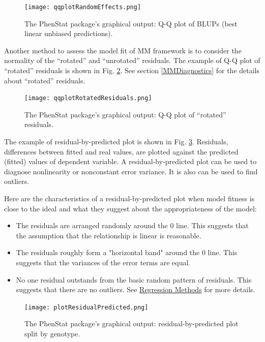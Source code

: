 \documentclass[12pt,a4paper]{article}
\begin{document}
\begin{figure}[!htpb]%
\centerline{\texttt{[image: qqplotRandomEffects.png]}}
\caption{The PhenStat package's graphical output: Q-Q plot of BLUPs (best linear unbiased predictions).}\label{fig:11}
\end{figure}

Another method to assess the model fit of MM framework is to consider the normality of the ``rotated'' and ``unrotated'' residuals. The example of Q-Q plot of ``rotated'' residuals is shown in Fig. \ref{fig:12}. 
See section \ref{MMDiagnostics} for the details about ``rotated'' residuals.

\begin{figure}[!htpb]%
\centerline{\texttt{[image: qqplotRotatedResiduals.png]}}
\caption{The PhenStat package's graphical output: Q-Q plot of ``rotated'' residuals.}\label{fig:12}
\end{figure}

The example of residual-by-predicted plot is shown in Fig. \ref{fig:13}. Residuals, differences between fitted and real values, are plotted against the predicted (fitted) values of dependent variable.  
A residual-by-predicted plot can be used to diagnose nonlinearity or nonconstant error variance. It is also can be used to find outliers. 

Here are the characteristics of a residual-by-predicted plot when model fitness is close to the ideal and what they suggest about the appropriateness of the model:
\begin{itemize}
\item The residuals are arranged randomly around the 0 line. This suggests that the assumption that the relationship is linear is reasonable.
\item The residuals roughly form a "horizontal band" around the 0 line. This suggests that the variances of the error terms are equal.
\item No one residual outstands from the basic random pattern of residuals. This suggests that there are no outliers. See \href{https://onlinecourses.science.psu.edu/stat501/node/36}{Regression Methods} for more details.
\end{itemize}
\begin{figure}[!htpb]%
\centerline{\texttt{[image: plotResidualPredicted.png]}}
\caption{The PhenStat package's graphical output: residual-by-predicted plot split by genotype.}\label{fig:13}
\end{figure}
\end{document}
